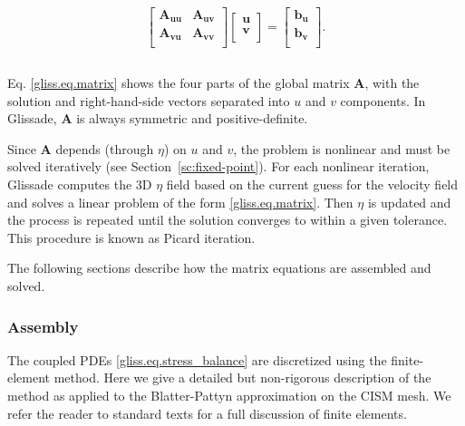 \begin{equation}
  \label{gliss.eq.matrix}
  \begin{matrix}
    \left[ \begin{matrix}
        \mathbf{A}_{\mathbf{uu}} & \mathbf{A}_{\mathbf{uv}}  \\
        \mathbf{A}_{\mathbf{vu}} & \mathbf{A}_{\mathbf{vv}}  \\
      \end{matrix} \right]\left[ \begin{matrix}
        \mathbf{u}  \\
        \mathbf{v}  \\
      \end{matrix} \right]=\left[ \begin{matrix}
        \mathbf{b}_{\mathbf{u}}  \\
        \mathbf{b}_{\mathbf{v}}  \\
      \end{matrix} \right]. \\ 
    \\ 
  \end{matrix}
\end{equation}

\noindent
Eq. \eqref{gliss.eq.matrix} shows the four parts of the global matrix $\mathbf{A}$,
with the solution and right-hand-side vectors separated into $u$ and $v$ components.
In Glissade, $\mathbf{A}$ is always symmetric and positive-definite.

Since $\mathbf{A}$ depends (through $\eta$) on $u$ and $v$, the problem is nonlinear and must be solved iteratively
(see Section~\ref{sc:fixed-point}).
For each nonlinear iteration, Glissade computes the 3D $\eta$ field based on the
current guess for the velocity field and solves a linear problem of the form \eqref{gliss.eq.matrix}.
Then $\eta$ is updated and the process is repeated until the solution converges to within a given tolerance.
This procedure is known as Picard iteration.

The following sections describe how the matrix equations are assembled and solved. 

\subsubsection{Assembly}
\label{sec:glissade-assembly}
The coupled PDEs \eqref{gliss.eq.stress_balance} are discretized using the finite-element method.
Here we give a detailed but non-rigorous description of the method as applied to the Blatter-Pattyn
approximation on the CISM mesh.
We refer the reader to standard texts \citep[e.g.,][]{Hughes2000} for a full discussion of finite elements.

